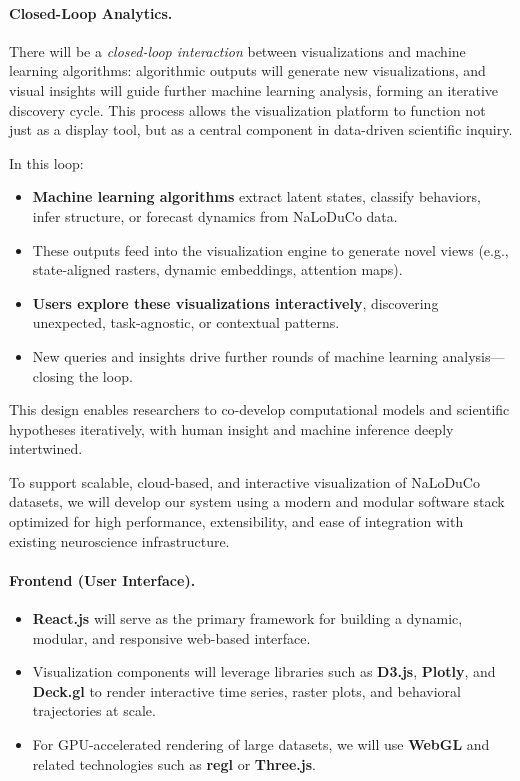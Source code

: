 \paragraph{Closed-Loop Analytics.}
There will be a \emph{closed-loop interaction} between visualizations and machine learning algorithms: algorithmic outputs will generate new visualizations, and visual insights will guide further machine learning analysis, forming an iterative discovery cycle. This process allows the visualization platform to function not just as a display tool, but as a central component in data-driven scientific inquiry.

In this loop:
\begin{itemize}
  \item \textbf{Machine learning algorithms} extract latent states, classify behaviors, infer structure, or forecast dynamics from NaLoDuCo data.
  \item These outputs feed into the visualization engine to generate novel views (e.g., state-aligned rasters, dynamic embeddings, attention maps).
  \item \textbf{Users explore these visualizations interactively}, discovering unexpected, task-agnostic, or contextual patterns.
  \item New queries and insights drive further rounds of machine learning analysis—closing the loop.
\end{itemize}

This design enables researchers to co-develop computational models and scientific hypotheses iteratively, with human insight and machine inference deeply intertwined.

\label{sec:visSoftwareStack}

To support scalable, cloud-based, and interactive visualization of NaLoDuCo
datasets, we will develop our system using a modern and modular software stack
optimized for high performance, extensibility, and ease of integration with
existing neuroscience infrastructure.

\paragraph{Frontend (User Interface).}
\begin{itemize}
          \item \textbf{React.js} will serve as the primary framework for
              building a dynamic, modular, and responsive web-based interface.
                \item Visualization components will leverage libraries such as
                    \textbf{D3.js}, \textbf{Plotly}, and \textbf{Deck.gl} to
                    render interactive time series, raster plots, and
                    behavioral trajectories at scale.
                      \item For GPU-accelerated rendering of large datasets, we
                          will use \textbf{WebGL} and related technologies such
                          as \textbf{regl} or \textbf{Three.js}.
\end{itemize}

